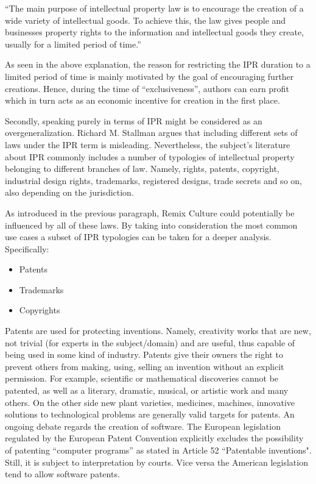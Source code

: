 \begin{displayquote}
“The main purpose of intellectual property law is to encourage the creation of a wide variety of intellectual goods. To achieve this, the law gives people and businesses property rights to the information and intellectual goods they create, usually for a limited period of time.”
\end{displayquote}

As seen in the above explanation, the reason for restricting the IPR duration to a limited period of time is mainly motivated by the goal of encouraging further creations. Hence, during the time of “exclusiveness”, authors can earn profit which in turn acts as an economic incentive for creation in the first place.

Secondly, speaking purely in terms of IPR might be considered as an overgeneralization. Richard M. Stallman argues that including different sets of laws under the IPR term is misleading. Nevertheless, the subject’s literature about IPR commonly includes a number of typologies of intellectual property belonging to different branches of law. Namely, rights, patents, copyright, industrial design rights, trademarks, registered designs, trade secrets and so on, also depending on the jurisdiction.

As introduced in the previous paragraph, Remix Culture could potentially be influenced by all of these laws. By taking into consideration the most common use cases a subset of IPR typologies can be taken for a deeper analysis. Specifically:

\begin{itemize}
\item Patents
\item Trademarks
\item Copyrights 
\end{itemize}

Patents are used for protecting inventions. Namely, creativity works that are new, not trivial (for experts in the subject/domain) and are useful, thus capable of being used in some kind of industry. Patents give their owners the right to prevent others from making, using, selling an invention without an explicit permission. For example, scientific or mathematical discoveries cannot be patented, as well as a literary, dramatic, musical, or artistic work and many others. On the other side new plant varieties, medicines, machines, innovative solutions to technological problems are generally valid targets for patents.
An ongoing debate regards the creation of software. The European legislation regulated by the European Patent Convention explicitly excludes the possibility of patenting “computer programs” as stated in Article 52 “Patentable inventions". Still, it is subject to interpretation by courts. Vice versa the American legislation tend to allow software patents.

